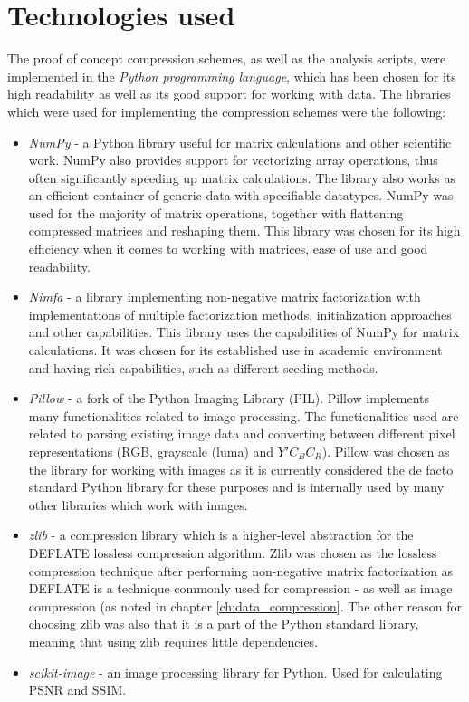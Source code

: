 \documentclass[thesis=M,english]{FITthesis}[2012/10/20]
\begin{document}
\section{Technologies used}
The proof of concept compression schemes, as well as the analysis scripts, were implemented
in the \emph{Python programming language}, which has been chosen for its high readability
as well as its good support for working with data. The libraries which were used for
implementing the compression schemes were the following:
\begin{itemize}
  \item \emph{NumPy} - a Python library useful for matrix calculations and other scientific work.
        NumPy also provides support for vectorizing array operations, thus often significantly
        speeding up matrix calculations. The library also works as an efficient container of
        generic data with specifiable datatypes. NumPy was used for the majority of matrix
        operations, together with flattening compressed matrices and reshaping them. This library
        was chosen for its high efficiency when it comes to working with matrices, ease of use
        and good readability.\cite{numpy}
  \item \emph{Nimfa} - a library implementing non-negative matrix factorization
        with implementations of multiple factorization methods, initialization
        approaches and other capabilities. This library uses the capabilities of NumPy
        for matrix calculations. It was chosen for its established use in academic
        environment and having rich capabilities, such as different seeding methods.\cite{nimfa}
  \item \emph{Pillow} - a fork of the Python Imaging Library (PIL).
        Pillow implements many functionalities related to image processing. The
        functionalities used are related to parsing existing image data and converting
        between different pixel representations (RGB, grayscale (luma) and $Y'C_BC_R$).
        Pillow was chosen as the library for working with images as it is currently
        considered the de facto standard Python library for these purposes and is internally
        used by many other libraries which work with images.\cite{pillow}
  \item \emph{zlib} - a compression library which is a higher-level abstraction for the DEFLATE
        lossless compression algorithm. Zlib was chosen as the lossless compression
        technique after performing non-negative matrix factorization as DEFLATE is a technique commonly
        used for compression - as well as image compression (as noted in chapter \ref{ch:data_compression}.
        The other reason for choosing zlib was also that it is
	   a part of the Python standard library, meaning that using zlib requires little
	   dependencies.
  \item \emph{scikit-image} - an image processing library for Python. Used for
        calculating PSNR and SSIM.\cite{scikit-image}
\end{itemize}
\end{document}
